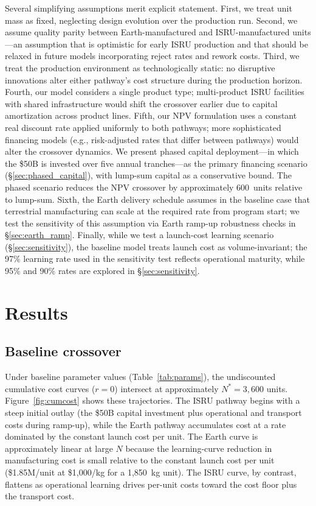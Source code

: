 \documentclass[preprint,12pt]{elsarticle}
\begin{document}
Several simplifying assumptions merit explicit statement. First, we treat unit mass as fixed, neglecting design evolution over the production run. Second, we assume quality parity between Earth-manufactured and ISRU-manufactured units---an assumption that is optimistic for early ISRU production and that should be relaxed in future models incorporating reject rates and rework costs. Third, we treat the production environment as technologically static: no disruptive innovations alter either pathway's cost structure during the production horizon. Fourth, our model considers a single product type; multi-product ISRU facilities with shared infrastructure would shift the crossover earlier due to capital amortization across product lines. Fifth, our NPV formulation uses a constant real discount rate applied uniformly to both pathways; more sophisticated financing models (e.g., risk-adjusted rates that differ between pathways) would alter the crossover dynamics. We present phased capital deployment---in which the \$50B is invested over five annual tranches---as the primary financing scenario (\S\ref{sec:phased_capital}), with lump-sum capital as a conservative bound. The phased scenario reduces the NPV crossover by approximately 600~units relative to lump-sum. Sixth, the Earth delivery schedule assumes in the baseline case that terrestrial manufacturing can scale at the required rate from program start; we test the sensitivity of this assumption via Earth ramp-up robustness checks in \S\ref{sec:earth_ramp}. Finally, while we test a launch-cost learning scenario (\S\ref{sec:sensitivity}), the baseline model treats launch cost as volume-invariant; the 97\% learning rate used in the sensitivity test reflects operational maturity, while 95\% and 90\% rates are explored in \S\ref{sec:sensitivity}.

\section{Results}
\label{sec:results}

\subsection{Baseline crossover}

Under baseline parameter values (Table~\ref{tab:params}), the undiscounted cumulative cost curves ($r = 0$) intersect at approximately $N^* = 3{,}600$ units. Figure~\ref{fig:cumcost} shows these trajectories. The ISRU pathway begins with a steep initial outlay (the \$50B capital investment plus operational and transport costs during ramp-up), while the Earth pathway accumulates cost at a rate dominated by the constant launch cost per unit. The Earth curve is approximately linear at large $N$ because the learning-curve reduction in manufacturing cost is small relative to the constant launch cost per unit (\$1.85M/unit at \$1{,}000/kg for a 1{,}850~kg unit). The ISRU curve, by contrast, flattens as operational learning drives per-unit costs toward the cost floor plus the transport cost.
\end{document}
